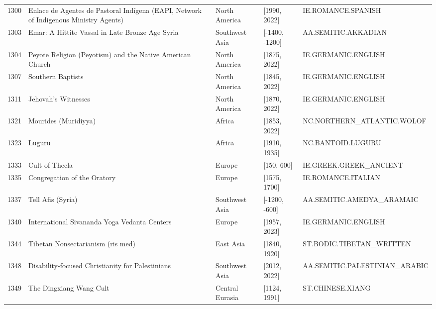 {\begin{longtable}{rp{3.5cm}llp{3.5cm}}
1300 & {\raggedright Enlace de Agentes de Pastoral Indígena (EAPI, Network of Indigenous Ministry Agents)} & North America & [1990, 2022] & {\raggedright IE.\allowbreak{}ROMANCE.\allowbreak{}SPANISH} \\
1303 & {\raggedright Emar: A Hittite Vassal in Late Bronze Age Syria} & Southwest Asia & [-1400, -1200] & {\raggedright AA.\allowbreak{}SEMITIC.\allowbreak{}AKKADIAN} \\
1304 & {\raggedright Peyote Religion (Peyotism) and the Native American Church} & North America & [1875, 2022] & {\raggedright IE.\allowbreak{}GERMANIC.\allowbreak{}ENGLISH} \\
1307 & {\raggedright Southern Baptists} & North America & [1845, 2022] & {\raggedright IE.\allowbreak{}GERMANIC.\allowbreak{}ENGLISH} \\
1311 & {\raggedright Jehovah's Witnesses} & North America & [1870, 2022] & {\raggedright IE.\allowbreak{}GERMANIC.\allowbreak{}ENGLISH} \\
1321 & {\raggedright Mourides (Muridiyya)} & Africa & [1853, 2022] & {\raggedright NC.\allowbreak{}NORTHERN\_\allowbreak{}ATLANTIC.\allowbreak{}WOLOF} \\
1323 & {\raggedright Luguru} & Africa & [1910, 1935] & {\raggedright NC.\allowbreak{}BANTOID.\allowbreak{}LUGURU} \\
1333 & {\raggedright Cult of Thecla} & Europe & [150, 600] & {\raggedright IE.\allowbreak{}GREEK.\allowbreak{}GREEK\_\allowbreak{}ANCIENT} \\
1335 & {\raggedright Congregation of the Oratory} & Europe & [1575, 1700] & {\raggedright IE.\allowbreak{}ROMANCE.\allowbreak{}ITALIAN} \\
1337 & {\raggedright Tell Afis (Syria)} & Southwest Asia & [-1200, -600] & {\raggedright AA.\allowbreak{}SEMITIC.\allowbreak{}AMEDYA\_\allowbreak{}ARAMAIC} \\
1340 & {\raggedright International Sivananda Yoga Vedanta Centers} & Europe & [1957, 2023] & {\raggedright IE.\allowbreak{}GERMANIC.\allowbreak{}ENGLISH} \\
1344 & {\raggedright Tibetan Nonsectarianism (ris med)} & East Asia & [1840, 1920] & {\raggedright ST.\allowbreak{}BODIC.\allowbreak{}TIBETAN\_\allowbreak{}WRITTEN} \\
1348 & {\raggedright Disability-focused Christianity for Palestinians} & Southwest Asia & [2012, 2022] & {\raggedright AA.\allowbreak{}SEMITIC.\allowbreak{}PALESTINIAN\_\allowbreak{}ARABIC} \\
1349 & {\raggedright The Dingxiang Wang Cult} & Central Eurasia & [1124, 1991] & {\raggedright ST.\allowbreak{}CHINESE.\allowbreak{}XIANG} \\

\end{longtable}}
